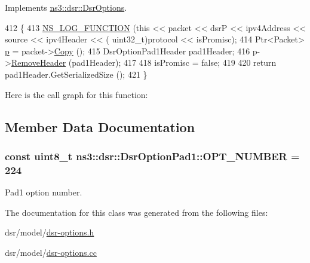 Implements \hyperlink{classns3_1_1dsr_1_1DsrOptions_ac34fb87a95464f3ea9d82ad12253a5cc}{ns3\+::dsr\+::\+Dsr\+Options}.


\begin{DoxyCode}
412 \{
413   \hyperlink{log-macros-disabled_8h_a90b90d5bad1f39cb1b64923ea94c0761}{NS\_LOG\_FUNCTION} (\textcolor{keyword}{this} << packet << dsrP << ipv4Address << source << ipv4Header << (
      uint32\_t)protocol << isPromisc);
414   Ptr<Packet> \hyperlink{lte__link__budget_8m_ac9de518908a968428863f829398a4e62}{p} = packet->\hyperlink{classns3_1_1Packet_a5d5c70802a5f77fc5f0001e0cfc1898b}{Copy} ();
415   DsrOptionPad1Header pad1Header;
416   p->\hyperlink{classns3_1_1Packet_a0961eccf975d75f902d40956c93ba63e}{RemoveHeader} (pad1Header);
417 
418   isPromisc = \textcolor{keyword}{false};
419 
420   \textcolor{keywordflow}{return} pad1Header.GetSerializedSize ();
421 \}
\end{DoxyCode}


Here is the call graph for this function\+:




\subsection{Member Data Documentation}
\subsubsection[{\texorpdfstring{O\+P\+T\+\_\+\+N\+U\+M\+B\+ER}{OPT_NUMBER}}]{\setlength{\rightskip}{0pt plus 5cm}const uint8\+\_\+t ns3\+::dsr\+::\+Dsr\+Option\+Pad1\+::\+O\+P\+T\+\_\+\+N\+U\+M\+B\+ER = 224\hspace{0.3cm}{\ttfamily [static]}}\hypertarget{classns3_1_1dsr_1_1DsrOptionPad1_aed73f137a2869c0d6b89ec0309f77521}{}\label{classns3_1_1dsr_1_1DsrOptionPad1_aed73f137a2869c0d6b89ec0309f77521}


Pad1 option number. 



The documentation for this class was generated from the following files\+:\begin{DoxyCompactItemize}
\item 
dsr/model/\hyperlink{dsr-options_8h}{dsr-\/options.\+h}\item 
dsr/model/\hyperlink{dsr-options_8cc}{dsr-\/options.\+cc}\end{DoxyCompactItemize}
